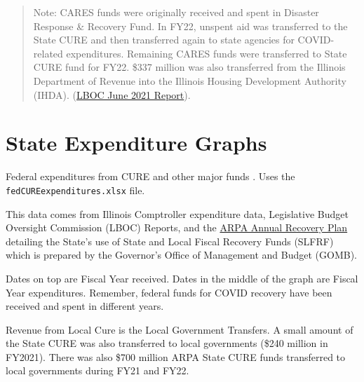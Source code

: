 \documentclass[
  letterpaper,
  DIV=11,
  numbers=noendperiod]{scrreport}
\begin{document}
\begin{quote}
\begin{tcolorbox}[enhanced jigsaw, coltitle=black, titlerule=0mm, leftrule=.75mm, colbacktitle=quarto-callout-note-color!10!white, arc=.35mm, rightrule=.15mm, opacityback=0, colframe=quarto-callout-note-color-frame, toptitle=1mm, opacitybacktitle=0.6, bottomtitle=1mm, title=\textcolor{quarto-callout-note-color}{\faInfo}\hspace{0.5em}{Note}, colback=white, breakable, toprule=.15mm, left=2mm, bottomrule=.15mm]

Note: CARES funds were originally received and spent in Disaster
Response \& Recovery Fund. In FY22, unspent aid was transferred to the
State CURE and then transferred again to state agencies for
COVID-related expenditures. Remaining CARES funds were transferred to
State CURE fund for FY22. \$337 million was also transferred from the
Illinois Department of Revenue into the Illinois Housing Development
Authority (IHDA).
(\href{https://budget.illinois.gov/content/dam/soi/en/web/budget/documents/lboc/lboc-report-june-2021-final.pdf}{LBOC
June 2021 Report}).

\end{tcolorbox}
\end{quote}

\hypertarget{sec-state-expenditure-graphs}{%
\section{State Expenditure Graphs}\label{sec-state-expenditure-graphs}}

Federal expenditures from CURE and other major funds . Uses the
\texttt{fedCUREexpenditures.xlsx} file.

This data comes from Illinois Comptroller expenditure data, Legislative
Budget Oversight Commission (LBOC) Reports, and the
\href{https://budget.illinois.gov/content/dam/soi/en/web/budget/documents/arpa/IL\%20Recovery\%20Plan\%20Performance\%20Report\%202022.pdf}{ARPA
Annual Recovery Plan} detailing the State's use of State and Local
Fiscal Recovery Funds (SLFRF) which is prepared by the Governor's Office
of Management and Budget (GOMB).

Dates on top are Fiscal Year received. Dates in the middle of the graph
are Fiscal Year expenditures. Remember, federal funds for COVID recovery
have been received and spent in different years.

Revenue from Local Cure is the Local Government Transfers. A small
amount of the State CURE was also transferred to local governments
(\$240 million in FY2021). There was also \$700 million ARPA State CURE
funds transferred to local governments during FY21 and FY22.
\end{document}
